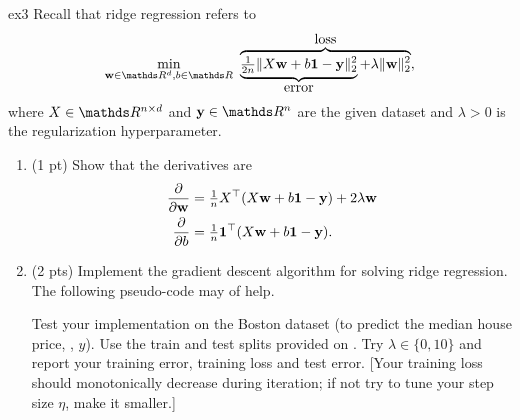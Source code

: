 \documentclass{tron}
\newcommand{\mref}[1]{\underline{\textbf{\hypersetup{linkcolor=orange}\Cref{#1}\hypersetup{linkcolor=blue}}}}
\begin{document}
\newpage
\setcounter{section}{3}
\begin{exercise}{ex3}
Recall that ridge regression refers to
\begin{align}
\min_{\wv\in \RR^d, b\in \RR} ~ \overbrace{\underbrace{\tfrac{1}{2n} \|X \wv+ b\one - \yv\|_2^2}_{\mbox{error}} + \lambda \|\wv\|_2^2}^{\mbox{loss}},\label{ex31:loss}
\end{align}
where $X \in \RR^{n \times d}$ and $\yv \in \RR^n$ are the given dataset and $\lambda > 0$ is the regularization hyperparameter.

\begin{enumerate}
\item (1 pt) Show that the derivatives are
\begin{align}
\frac{\partial}{\partial\mathbf{w}} &=  \tfrac1n X^\top (X\mathbf{w} + b\mathbf{1} - \mathbf{y}) + 2 \lambda \mathbf{w}\\
\label{eq:b}
\frac{\partial}{\partial b} &= \tfrac1n \mathbf{1}^\top (X\mathbf{w} + b\mathbf{1} - \mathbf{y}).
\end{align}

    \ans{\mref{ans:3:1}} 

\item (2 pts) Implement the gradient descent algorithm for solving ridge regression. The following  pseudo-code may of help.

Test your implementation on the Boston \href{http://lib.stat.cmu.edu/datasets/boston}{\textsf{}} dataset (to predict the median house price, \ie, $y$). Use the train and test splits provided on \href{http://www.gautamkamath.com/courses/CS480-wi2021.html}{}. Try $\lambda \in \{0, 10\}$ and report your training error, training loss and test error. [Your training loss should monotonically decrease during iteration; if not try to tune your step size $\eta$, \eg make it smaller.]

\begin{algorithm}[H]
\DontPrintSemicolon




\end{algorithm}
\end{enumerate}
\end{exercise}
\end{document}
